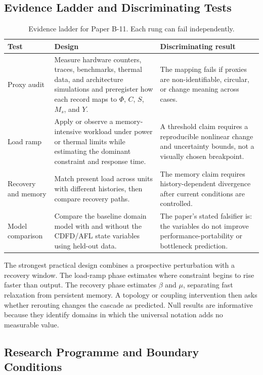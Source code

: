 \documentclass[11pt]{article}
\begin{document}
\subsection{Evidence Ladder and Discriminating Tests}

\begin{table}[htbp]
\centering
\small
\caption{Evidence ladder for Paper B-11. Each rung can fail independently.}
\begin{tabularx}{\textwidth}{|p{}|X|X|}
\hline
\textbf{Test} & \textbf{Design} & \textbf{Discriminating result} \\
\hline
Proxy audit & Measure hardware counters, traces, benchmarks, thermal data, and architecture simulations and preregister how each record maps to $\Phi$, $C$, $S$, $M_s$, and $Y$. & The mapping fails if proxies are non-identifiable, circular, or change meaning across cases. \\
\hline
Load ramp & Apply or observe a memory-intensive workload under power or thermal limits while estimating the dominant constraint and response time. & A threshold claim requires a reproducible nonlinear change and uncertainty bounds, not a visually chosen breakpoint. \\
\hline
Recovery and memory & Match present load across units with different histories, then compare recovery paths. & The memory claim requires history-dependent divergence after current conditions are controlled. \\
\hline
Model comparison & Compare the baseline domain model with and without the CDFD/AFL state variables using held-out data. & The paper's stated falsifier is: the variables do not improve performance-portability or bottleneck prediction. \\
\hline
\end{tabularx}
\end{table}

The strongest practical design combines a prospective perturbation with a
recovery window. The load-ramp phase estimates where constraint begins to rise
faster than output. The recovery phase estimates $\beta$ and $\mu$, separating
fast relaxation from persistent memory. A topology or coupling intervention
then asks whether rerouting changes the cascade as predicted. Null results are
informative because they identify domains in which the universal notation adds
no measurable value.

\subsection{Research Programme and Boundary Conditions}
\end{document}
